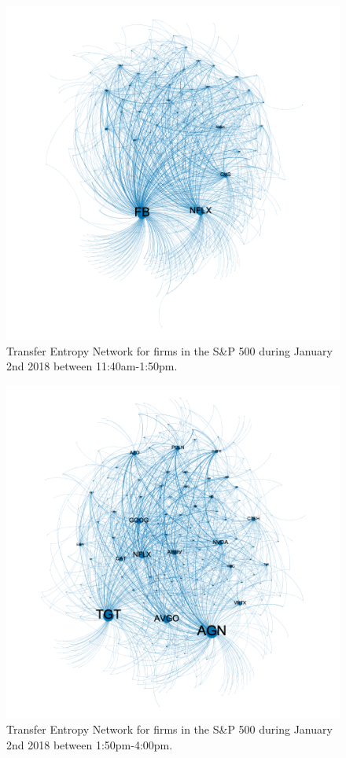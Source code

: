 \begin{figure}[!htb]
  \centerline{\includegraphics[scale=0.6]{figures/PredIF/Networks/figures/20180102-1sec-2of3.png}}
  \caption{Transfer Entropy Network for firms in the S\&P 500 during January 2nd 2018 between 11:40am-1:50pm. }
  \label{fig:20180102-1sec-2of3}
\end{figure}

\begin{figure}[!htb]
  \centerline{\includegraphics[scale=0.6]{figures/PredIF/Networks/figures/20180102-1sec-3of3.png}}
  \caption{Transfer Entropy Network for firms in the S\&P 500 during January 2nd 2018 between 1:50pm-4:00pm. }
  \label{fig:20180102-1sec-3of3}
\end{figure}

